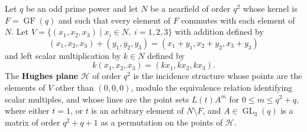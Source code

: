 Let $q$ be an odd prime power and let $N$ be a nearfield of order $q^2$ whose kernel is $F = \operatorname{GF}(q)$ and such that every element of $F$ commutes with each element of $N$. Let $V = \{(x_1, x_2, x_3) \mid x_i \in N,\; i = 1, 2, 3\}$ with addition defined by
$$(x_1, x_2, x_3) + (y_1, y_2, y_3) = (x_1 + y_1, x_2 + y_2, x_3 + y_3)$$
and left scalar multiplication by $k \in N$ defined by
$$k(x_1, x_2, x_3) = (kx_1, kx_2, kx_3).$$
The \textbf{Hughes plane} $\mathcal{H}$ of order $q^2$ is the incidence structure whose points are the elements of $V$ other than $(0,0,0)$, modulo the equivalence relation identifying scalar multiples, and whose lines are the point sets $L(t)A^m$ for $0 \leq m \leq q^2 + q$, where either $t = 1$, or $t$ is an arbitrary element of $N \setminus F$, and $A \in \operatorname{GL}_3(q)$ is a matrix of order $q^2+q+1$ as a permutation on the points of $\mathcal{H}$.
